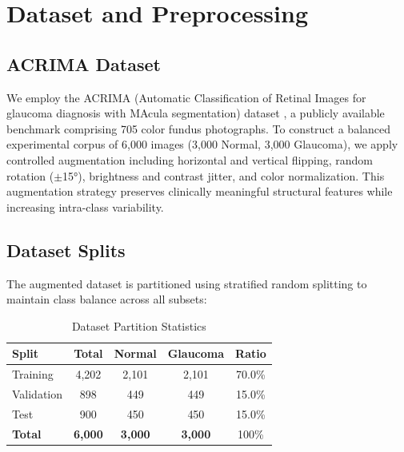 \documentclass[conference]{IEEEtran}
\begin{document}
\section{Dataset and Preprocessing}
\label{sec:dataset}

\subsection{ACRIMA Dataset}

We employ the ACRIMA (Automatic Classification of 
Retinal Images for glaucoma diagnosis with MAcula 
segmentation) dataset \cite{b8}, a publicly available 
benchmark comprising 705 color fundus photographs. 
To construct a balanced experimental corpus of 6,000 
images (3,000 Normal, 3,000 Glaucoma), we apply 
controlled augmentation including horizontal and 
vertical flipping, random rotation ($\pm$15°), 
brightness and contrast jitter, and color normalization. 
This augmentation strategy preserves clinically 
meaningful structural features while increasing 
intra-class variability.

\subsection{Dataset Splits}

The augmented dataset is partitioned using stratified 
random splitting to maintain class balance across 
all subsets:

\begin{table}[htbp]
\caption{Dataset Partition Statistics}
\begin{center}
\begin{tabular}{lcccc}
\toprule
\textbf{Split} & \textbf{Total} & 
\textbf{Normal} & \textbf{Glaucoma} & 
\textbf{Ratio} \\
\midrule
Training   & 4,202 & 2,101 & 2,101 & 70.0\% \\
Validation &   898 &   449 &   449 & 15.0\% \\
Test       &   900 &   450 &   450 & 15.0\% \\
\midrule
\textbf{Total} & \textbf{6,000} & 
\textbf{3,000} & \textbf{3,000} & 100\% \\
\bottomrule
\end{tabular}
\label{tab:dataset}
\end{center}
\end{table}
\end{document}
